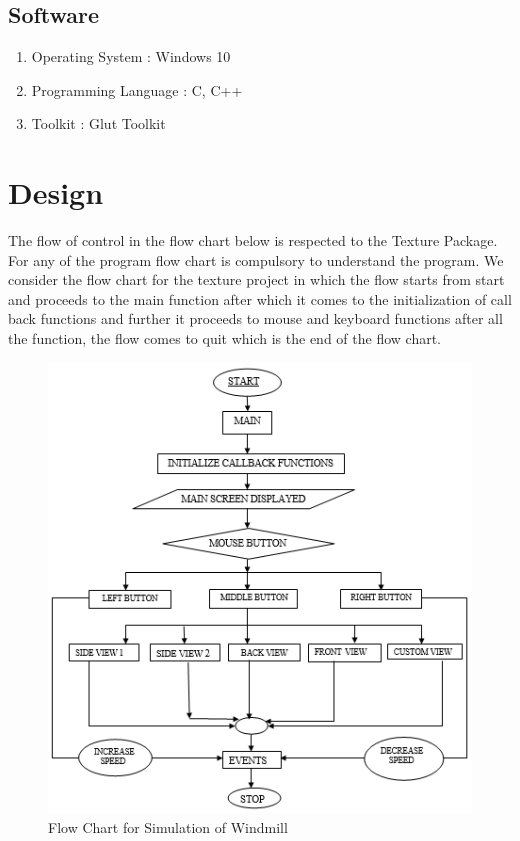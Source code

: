 \documentclass[fontsize=12pt]{article}
\begin{document}
\subsection{Software}
\begin{enumerate}
\item Operating System		: Windows 10
\item Programming Language	: C, C++
\item Toolkit				: Glut Toolkit
\end{enumerate}

\section{Design}

The flow of control in the flow chart below is respected to the Texture Package. For any of the program flow chart is compulsory to understand the program. We consider the flow chart for the texture project in which the flow starts from start and proceeds to the main function after which it comes to the initialization of call back functions and further it proceeds to mouse and keyboard functions after all the function, the flow comes to quit which is the end of the flow chart. 

\begin{figure}[h]
	\centering
  	\includegraphics{Flow_Chart.PNG}
  	\caption{Flow Chart for Simulation of Windmill}
  	\label{fig:FlowChart}
\end{figure}
\end{document}
